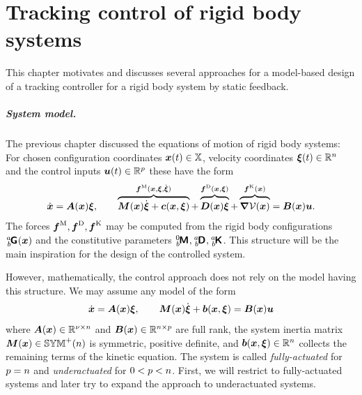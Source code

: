 \chapter{Tracking control of rigid body systems}\label{chap:Ctrl}
This chapter motivates and discusses several approaches for a model-based design of a tracking controller for a rigid body system by static feedback.

\paragraph{System model.}
The previous chapter discussed the equations of motion of rigid body systems:
For chosen configuration coordinates $\boldsymbol{x}(t) \in \mathbb{X}$, velocity coordinates $\boldsymbol{\xi}(t) \in\mathbb{R}^{n}$ and the control inputs $\boldsymbol{u}(t)\in\mathbb{R}^{p}$ these have the form
\begin{align}\label{eq:CtrlSysMdl}
 \sysCoordd = \kinMat(\sysCoord) \sysVel, 
\qquad
 \overbrace{\sysInertiaMat(\sysCoord) \sysVeld + \gyroForce(\sysCoord, \sysVel)}^{\genForceInertia(\sysCoord, \sysVel, \sysVeld)} + \overbrace{\sysDissMat(\sysCoord)\sysVel\vphantom{\sysVeld}}^{\genForceDiss(\sysCoord, \sysVel)} + \overbrace{\differential\potentialEnergy(\sysCoord)\vphantom{\sysVeld}}^{\genForceStiff(\sysCoord)} = \sysInputMat(\sysCoord) \sysInput.
\end{align}
The forces $\boldsymbol{f}^{\mathrm{M}}, \boldsymbol{f}^{\mathrm{D}}, \boldsymbol{f}^{\mathrm{K}}$ may be computed from the rigid body configurations $\bodyHomoCoord{\BidxI}{\BidxII}(\sysCoord)$ and the constitutive parameters $\bodyInertiaMat{0}{\BidxII}, \bodyDissMat{\BidxI}{\BidxII}, \bodyStiffMat{\BidxI}{\BidxII}$.
This structure will be the main inspiration for the design of the controlled system.

However, mathematically, the control approach does not rely on the model having this structure.
We may assume any model of the form 
\begin{align}\label{eq:CtrlSysMdl2}
 \dot{\boldsymbol{x}} = \boldsymbol{A}(\boldsymbol{x}) \boldsymbol{\xi}, 
\qquad
 \boldsymbol{M}(\boldsymbol{x}) \dot{\boldsymbol{\xi}} + \boldsymbol{b}(\boldsymbol{x},\boldsymbol{\xi}) = \boldsymbol{B}(\boldsymbol{x})\boldsymbol{u}
\end{align}
where $\boldsymbol{A}(\boldsymbol{x}) \in \mathbb{R}^{\nu\times n}$ and $\boldsymbol{B}(\boldsymbol{x}) \in \mathbb{R}^{n\times p}$ are full rank, the system inertia matrix $\boldsymbol{M}(\boldsymbol{x}) \in \mathbb{SYM}^{+}(n)$ is symmetric, positive definite, and $\boldsymbol{b}(\boldsymbol{x}, \boldsymbol{\xi}) \in \mathbb{R}^{n}$ collects the remaining terms of the kinetic equation.
The system is called \textit{fully-actuated} for $p = n$ and \textit{underactuated} for $0 < p < n$.
First, we will restrict to fully-actuated systems and later try to expand the approach to underactuated systems.


